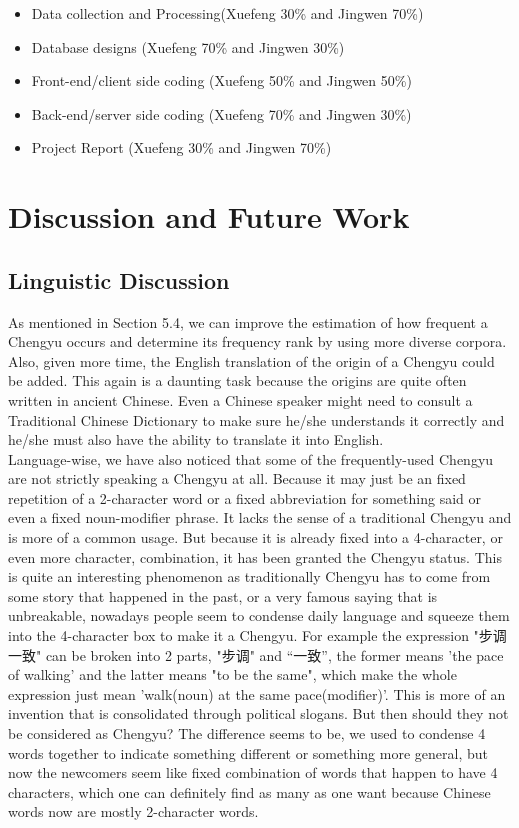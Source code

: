\documentclass[11pt]{article} %
\begin{document}
\begin{itemize}
  \item Data collection and Processing(Xuefeng 30\% and Jingwen 70\%)
    \item Database designs (Xuefeng 70\% and Jingwen 30\%)
    \item Front-end/client side coding (Xuefeng 50\% and Jingwen 50\%)
    \item Back-end/server side coding (Xuefeng 70\% and Jingwen 30\%)
    \item Project Report (Xuefeng 30\% and Jingwen 70\%)
\end{itemize}

\section{Discussion and Future Work}
\subsection{Linguistic Discussion}
As mentioned in Section 5.4, we can improve the estimation of how frequent a Chengyu occurs and determine its frequency rank by using more diverse corpora.\\
Also, given more time, the English translation of the origin of a Chengyu could be added. This again is a daunting task because the origins are quite often written in ancient Chinese. Even a Chinese speaker might need to consult a Traditional Chinese Dictionary to make sure he/she understands it correctly and he/she must also have the ability to translate it into English.\\
Language-wise, we have also noticed that some of the frequently-used Chengyu are not strictly speaking a Chengyu at all. Because it may just be an fixed repetition of a 2-character word or a fixed abbreviation for something said or even a fixed noun-modifier phrase. It lacks the sense of a traditional Chengyu and is more of a common usage. But because it is already fixed into a 4-character, or even more character, combination, it has been granted the Chengyu status. This is quite an interesting phenomenon as traditionally Chengyu has to come from some story that happened in the past, or a very famous saying that is unbreakable, nowadays people seem to condense daily language and squeeze them into the 4-character box to make it a Chengyu. For example the expression "步调一致" can be broken into 2 parts, "步调" and “一致”, the former means 'the pace of walking' and the latter means "to be the same", which make the whole expression just mean 'walk(noun) at the same pace(modifier)'. This is more of an invention that is consolidated through political slogans. But then should they not be considered as Chengyu? The difference seems to be, we used to condense 4 words together to indicate something different or something more general, but now the newcomers seem like fixed combination of words that happen to have 4 characters, which one can definitely find as many as one want because Chinese words now are mostly 2-character words.\\ 
\end{document}
